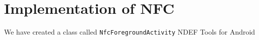 \section{Implementation of NFC}
We have created a class called \lstinline|NfcForegroundActivity|
NDEF Tools for Android \citep{ndeftools}